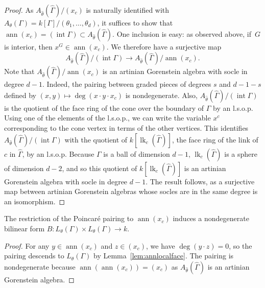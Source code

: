 \begin{proof}
As $A_{\hat{\theta}}(\hat{\Gamma})/(x_c)$ is naturally identified with $A_{\theta}(\Gamma) = k[\Gamma]/(\theta_1, \dotsc, \theta_d)$, it suffices to show that $\operatorname{ann}(x_c) = (\operatorname{int} \Gamma) \subset A_{\hat{\theta}}(\hat{\Gamma})$.
One inclusion is easy: 
as observed above, if~$G$ is interior, then $x^G \in \operatorname{ann}(x_c)$.
We therefore have a surjective map 
$$A_{\hat{\theta}}(\hat{\Gamma})/(\operatorname{int} \Gamma) \to A_{\hat{\theta}}(\hat{\Gamma})/\operatorname{ann}(x_c).$$
Note that $A_{\hat{\theta}}(\hat{\Gamma})/\operatorname{ann}(x_c)$ is an artinian Gorenstein algebra with socle in degree $d-1$. 
Indeed, the pairing 
between graded pieces of degrees $s$ and $d - 1 - s$ defined by
$(x, y) \mapsto \deg(x \cdot y \cdot x_c)$ is nondegenerate. 
Also, 
$A_{\hat{\theta}}(\hat{\Gamma})/(\operatorname{int} \Gamma)$
is the quotient of the face ring of the cone over the boundary of $\Gamma$ by an l.s.o.p. 
Using one of the elements of the l.s.o.p., we can write the variable $x^c$ corresponding to the cone vertex in terms of the other vertices. 
This identifies $A_{\hat{\theta}}(\hat{\Gamma})/(\operatorname{int} \Gamma)$ with the quotient of $k[\operatorname{lk}_{c}(\hat{\Gamma})]$, the face ring of the link of $c$ in $\hat{\Gamma}$, by an l.s.o.p. 
Because ${\Gamma}$ is a ball of dimension $d-1$, $\operatorname{lk}_c(\hat{\Gamma})$ is a sphere of dimension $d-2$, and so this quotient of $k[\operatorname{lk}_{c}(\hat{\Gamma})]$ is an artinian Gorenstein algebra with socle in degree $d-1$. The result follows, as a surjective map between artinian Gorenstein algebras whose socles are in the same degree is an isomorphism. 
\end{proof}

\begin{lemm}
The restriction of the Poincar\'{e} pairing to $\operatorname{ann}(x_c)$ induces a nondegenerate bilinear form $B \colon L_{\theta}(\Gamma) \times L_{\theta}(\Gamma) \to k$.
\end{lemm}

\begin{proof}
For any $y \in \operatorname{ann}(x_c)$ and $z \in (x_c)$, we have $\deg(y \cdot z) = 0$, so the pairing descends to $L_{\theta}(\Gamma)$ by Lemma~\ref{lem:annlocalface}. The pairing is nondegenerate because $\operatorname{ann}(\operatorname{ann}(x_c)) = (x_c)$ as $A_{\hat{\theta}}(\hat{\Gamma})$ is an artinian Gorenstein algebra. 
\end{proof}

